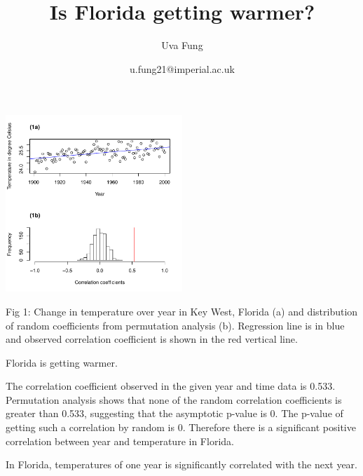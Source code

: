 \documentclass[12pt]{article}
\title{Is Florida getting warmer?}
\author{Uva Fung}
\date{u.fung21@imperial.ac.uk}
\begin{document}
  \maketitle
  
  
  \includegraphics[width=0.5\textwidth]{fig.pdf}


{\footnotesize Fig 1: Change in temperature over year in Key West, Florida (a) and distribution of random coefficients from permutation analysis (b). Regression line is in blue and observed correlation coefficient is shown in the red vertical line.  }


\vspace{\baselineskip}

  Florida is getting warmer. 

  The correlation coefficient observed in the given year and time data is 0.533. 
  Permutation analysis shows that none of the random correlation coefficients is greater than 0.533, 
  suggesting that the asymptotic p-value is 0. The p-value of getting such a correlation by random is 0. 
  Therefore there is a significant positive correlation between year and temperature in Florida. 
  
  In Florida, temperatures of one year is significantly correlated with the next year. 
\end{document}

